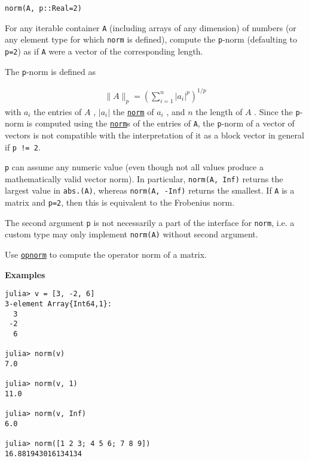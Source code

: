 \begin{adjustwidth}{2em}{0pt}


\begin{verbatim}
norm(A, p::Real=2)
\end{verbatim}

For any iterable container \texttt{A} (including arrays of any dimension) of numbers (or any element type for which \texttt{norm} is defined), compute the \texttt{p}-norm (defaulting to \texttt{p=2}) as if \texttt{A} were a vector of the corresponding length.

The \texttt{p}-norm is defined as

\begin{equation*}
\begin{split}\|A\|_p = \left( \sum_{i=1}^n | a_i | ^p \right)^{1/p}\end{split}\end{equation*}
with  \(a_i\)  the entries of  \(A\) ,  \(| a_i |\)  the \hyperlink{898926013064269707}{\texttt{norm}} of  \(a_i\) , and  \(n\)  the length of  \(A\) . Since the \texttt{p}-norm is computed using the \hyperlink{898926013064269707}{\texttt{norm}}s of the entries of \texttt{A}, the \texttt{p}-norm of a vector of vectors is not compatible with the interpretation of it as a block vector in general if \texttt{p != 2}.

\texttt{p} can assume any numeric value (even though not all values produce a mathematically valid vector norm). In particular, \texttt{norm(A, Inf)} returns the largest value in \texttt{abs.(A)}, whereas \texttt{norm(A, -Inf)} returns the smallest. If \texttt{A} is a matrix and \texttt{p=2}, then this is equivalent to the Frobenius norm.

The second argument \texttt{p} is not necessarily a part of the interface for \texttt{norm}, i.e. a custom type may only implement \texttt{norm(A)} without second argument.

Use \hyperlink{4740175223212326101}{\texttt{opnorm}} to compute the operator norm of a matrix.

\textbf{Examples}


\begin{verbatim}
julia> v = [3, -2, 6]
3-element Array{Int64,1}:
  3
 -2
  6

julia> norm(v)
7.0

julia> norm(v, 1)
11.0

julia> norm(v, Inf)
6.0

julia> norm([1 2 3; 4 5 6; 7 8 9])
16.881943016134134


\end{verbatim}
\end{adjustwidth}
